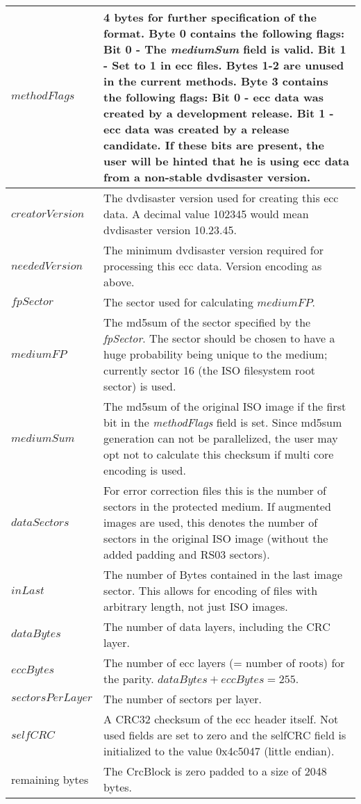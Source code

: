 \begin{tabular}{|l|p{12cm}|}
\hline
$methodFlags$ & 4 bytes for further specification of the format.\newline
Byte 0 contains the following flags:\newline
Bit 0 - The {\em mediumSum} field is valid.\newline
Bit 1 - Set to 1 in ecc files.\newline
Bytes 1-2 are unused in the current methods.\newline
Byte 3 contains the following flags:\newline
Bit 0 - ecc data was created by a development release.\newline
Bit 1 - ecc data was created by a release candidate.\newline
If these bits are present, the user will be hinted that he is using
ecc data from a non-stable dvdisaster version. \\
\hline
$creatorVersion$ & The dvdisaster version used for creating this ecc data.
A decimal value 102345 would mean dvdisaster version 10.23.45.\\
\hline
$neededVersion$ & The minimum dvdisaster version required for 
processing this ecc data. Version encoding as above. \\
\hline
$fpSector$ & The sector used for calculating $mediumFP$. \\
\hline
$mediumFP$ & The md5sum of the sector specified by the {\em fpSector}.
The sector should be chosen to have a huge probability being unique to the medium;
currently sector 16 (the ISO filesystem root sector) is used. \\
\hline
$mediumSum$ & The md5sum of the original ISO image if the first bit 
in the {\em methodFlags} field is set. Since md5sum generation can not be
parallelized, the user may opt not to calculate this checksum if multi core
encoding is used. \\
\hline
$dataSectors$ & For error correction files this is the number of sectors in the
protected medium. If augmented images are used, this denotes the number of
sectors in the original ISO image (without the added padding and RS03 sectors). \\
\hline
$inLast$ & The number of Bytes contained in the last image sector. This allows for
encoding of files with arbitrary length, not just ISO images.\\
\hline
$dataBytes$ & The number of data layers, including the CRC layer. \\
\hline
$eccBytes$ & The number of ecc layers (= number of roots) for the parity. \newline
$dataBytes + eccBytes = 255$. \\
\hline
$sectorsPerLayer$ & The number of sectors per layer. \\
\hline
$selfCRC$ & A CRC32 checksum of the ecc header itself. Not used fields are
set to zero and the selfCRC field is initialized to the 
value 0x4c5047 (little endian). \\
\hline
remaining bytes & The CrcBlock is zero padded to a size of 2048 bytes.\\
\hline
\end{tabular}
